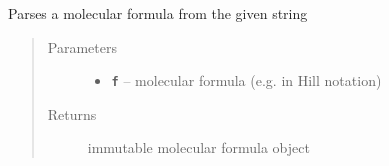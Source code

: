 \documentclass[letterpaper,10pt,openany,oneside]{sphinxmanual}
\begin{document}

\begin{fulllineitems}
\label{library:de.unijena.bioinf.sirius.parseFormula(String)}
Parses a molecular formula from the given string
\begin{quote}\begin{description}
\item[{Parameters}] \leavevmode\begin{itemize}
\item {} 
\textbf{\texttt{f}} -- molecular formula (e.g. in Hill notation)

\end{itemize}

\item[{Returns}] \leavevmode
immutable molecular formula object

\end{description}\end{quote}

\end{fulllineitems}

\end{document}
